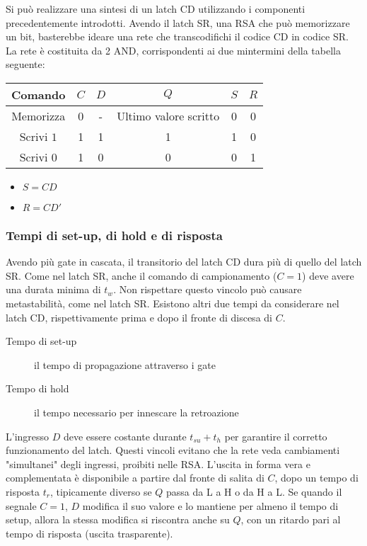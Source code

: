 \documentclass{subfiles}
\begin{document}
Si può realizzare una sintesi di un latch CD utilizzando i componenti precedentemente introdotti.
Avendo il latch SR, una RSA che può memorizzare un bit, basterebbe ideare una rete che transcodifichi il codice CD in codice SR.
La rete è costituita da 2 AND, corrispondenti ai due mintermini della tabella seguente:

\begin{center}
\begin{tabular}{ |c|c|c|c|c|c| }
\hline
Comando & $C$ & $D$ & $Q$ & $S$ & $R$ \\
\hline
\hline
Memorizza & 0 & - & Ultimo valore scritto & 0 & 0 \\
Scrivi $1$ & 1 & 1 & 1 & 1 & 0 \\
Scrivi $0$ & 1 & 0 & 0 & 0 & 1 \\
\hline
\end{tabular}
\end{center}

\begin{itemize}
    \item $S = CD$
    \item $R = CD'$
\end{itemize}

\subsubsection{Tempi di set-up, di hold e di risposta}

Avendo più gate in cascata, il transitorio del latch CD dura più di quello del latch SR.
Come nel latch SR, anche il comando di campionamento ($C=1$) deve avere una durata minima di $t_w$.
Non rispettare questo vincolo può causare metastabilità, come nel latch SR.
Esistono altri due tempi da considerare nel latch CD, rispettivamente prima e dopo il fronte di discesa di $C$.

\begin{description}
    \item[Tempo di set-up] il tempo di propagazione attraverso i gate
    \item[Tempo di hold] il tempo necessario per innescare la retroazione
\end{description}

\noindent
L'ingresso $D$ deve essere costante durante $t_{su}+t_h$ per garantire il corretto funzionamento del latch.
Questi vincoli evitano che la rete veda cambiamenti "simultanei" degli ingressi, proibiti nelle RSA.
L'uscita in forma vera e complementata è disponibile a partire dal fronte di salita di $C$, dopo un tempo di risposta $t_r$, tipicamente diverso se $Q$ passa da L a H o da H a L.
Se quando il segnale $C=1$, $D$ modifica il suo valore e lo mantiene per almeno il tempo di setup, allora la stessa modifica si riscontra anche su $Q$, con un ritardo pari al tempo di risposta (uscita trasparente).
\end{document}
